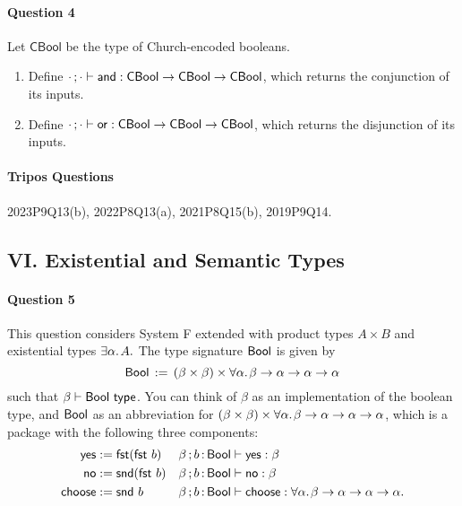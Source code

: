 \documentclass[11pt,a4paper,twoside]{article}
\begin{document}
\paragraph{Question 4} Let $\mathsf{CBool}$ be the type of Church-encoded booleans.

\begin{enumerate}[label=(\alph*)]
  \item Define $\cdot\, ; \cdot \vdash \mathsf{and} : \mathsf{CBool} \to \mathsf{CBool} \to \mathsf{CBool}$,
  which returns the conjunction of its inputs.
  
  \item Define $\cdot\, ; \cdot \vdash \mathsf{or} : \mathsf{CBool} \to \mathsf{CBool} \to \mathsf{CBool}$,
  which returns the disjunction of its inputs.
\end{enumerate}

\paragraph{Tripos Questions} 2023P9Q13(b), 2022P8Q13(a), 2021P8Q15(b), 2019P9Q14.

\subsection*{VI. Existential and Semantic Types}

\paragraph{Question 5} This question considers System F extended with product types $A \times B$ and existential types $\exists \alpha .\;\! A.$
The type signature $\mathsf{Bool}$ is given by
  \[ \mathsf{Bool} \,:=\, (\beta \times \beta) \times \forall \alpha .\;\! \beta \to \alpha \to \alpha \to \alpha \]
such that $\beta \vdash \mathsf{Bool}\ \mathsf{type}$. 
You can think of $\beta$ as an implementation of the boolean type,
and $\mathsf{Bool}$ as an abbreviation for 
$(\beta \times \beta) \times \forall \alpha .\;\! \beta \to \alpha \to \alpha \to \alpha$,
which is a package with the following three components:
\begin{align*}
  \mathsf{yes}    & := \mathsf{fst}(\mathsf{fst}\ b) & \beta \, ; b \,{:}\, \mathsf{Bool} & \vdash \mathsf{yes} : \beta \\
  \mathsf{no}     & := \mathsf{snd}(\mathsf{fst}\ b) & \beta \, ; b \,{:}\, \mathsf{Bool} & \vdash \mathsf{no} : \beta \\
  \mathsf{choose}    & := \mathsf{snd}\ b       & \beta \, ; b \,{:}\, \mathsf{Bool} & \vdash \mathsf{choose} : \forall \alpha .\;\! \beta \to \alpha \to \alpha \to \alpha.
\end{align*}
\end{document}
